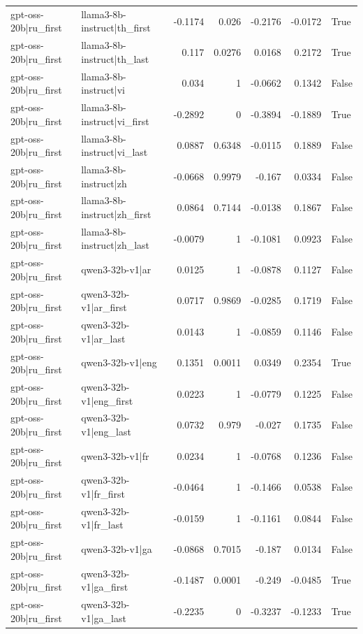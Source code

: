 \begin{table}
\begin{tabular}{l l r r r r l}
gpt-oss-20b|ru_first & llama3-8b-instruct|th_first & -0.1174 & 0.026 & -0.2176 & -0.0172 & True \\
gpt-oss-20b|ru_first & llama3-8b-instruct|th_last & 0.117 & 0.0276 & 0.0168 & 0.2172 & True \\
gpt-oss-20b|ru_first & llama3-8b-instruct|vi & 0.034 & 1 & -0.0662 & 0.1342 & False \\
gpt-oss-20b|ru_first & llama3-8b-instruct|vi_first & -0.2892 & 0 & -0.3894 & -0.1889 & True \\
gpt-oss-20b|ru_first & llama3-8b-instruct|vi_last & 0.0887 & 0.6348 & -0.0115 & 0.1889 & False \\
gpt-oss-20b|ru_first & llama3-8b-instruct|zh & -0.0668 & 0.9979 & -0.167 & 0.0334 & False \\
gpt-oss-20b|ru_first & llama3-8b-instruct|zh_first & 0.0864 & 0.7144 & -0.0138 & 0.1867 & False \\
gpt-oss-20b|ru_first & llama3-8b-instruct|zh_last & -0.0079 & 1 & -0.1081 & 0.0923 & False \\
gpt-oss-20b|ru_first & qwen3-32b-v1|ar & 0.0125 & 1 & -0.0878 & 0.1127 & False \\
gpt-oss-20b|ru_first & qwen3-32b-v1|ar_first & 0.0717 & 0.9869 & -0.0285 & 0.1719 & False \\
gpt-oss-20b|ru_first & qwen3-32b-v1|ar_last & 0.0143 & 1 & -0.0859 & 0.1146 & False \\
gpt-oss-20b|ru_first & qwen3-32b-v1|eng & 0.1351 & 0.0011 & 0.0349 & 0.2354 & True \\
gpt-oss-20b|ru_first & qwen3-32b-v1|eng_first & 0.0223 & 1 & -0.0779 & 0.1225 & False \\
gpt-oss-20b|ru_first & qwen3-32b-v1|eng_last & 0.0732 & 0.979 & -0.027 & 0.1735 & False \\
gpt-oss-20b|ru_first & qwen3-32b-v1|fr & 0.0234 & 1 & -0.0768 & 0.1236 & False \\
gpt-oss-20b|ru_first & qwen3-32b-v1|fr_first & -0.0464 & 1 & -0.1466 & 0.0538 & False \\
gpt-oss-20b|ru_first & qwen3-32b-v1|fr_last & -0.0159 & 1 & -0.1161 & 0.0844 & False \\
gpt-oss-20b|ru_first & qwen3-32b-v1|ga & -0.0868 & 0.7015 & -0.187 & 0.0134 & False \\
gpt-oss-20b|ru_first & qwen3-32b-v1|ga_first & -0.1487 & 0.0001 & -0.249 & -0.0485 & True \\
gpt-oss-20b|ru_first & qwen3-32b-v1|ga_last & -0.2235 & 0 & -0.3237 & -0.1233 & True \\

\end{tabular}
\end{table}
